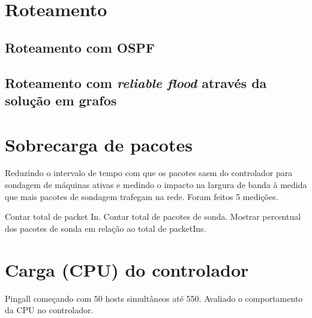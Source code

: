 \section{Roteamento}

\subsection{Roteamento com OSPF}
\subsection{Roteamento com \emph{reliable flood} através da solução em grafos}


\section{Sobrecarga de pacotes}

Reduzindo o intervalo de tempo com que os pacotes saem do controlador para 
sondagem de máquinas ativas e medindo o impacto na largura de banda à medida
que mais pacotes de sondagem trafegam na rede. Foram feitos 5 medições.



Contar total de packet In. Contar total de pacotes de sonda. Mostrar percentual
dos pacotes de sonda em relação ao total de packetIns.

\section{Carga (CPU) do controlador}

Pingall começando com 50 hosts simultâneos até 550. Avaliado o comportamento
da CPU no controlador.
